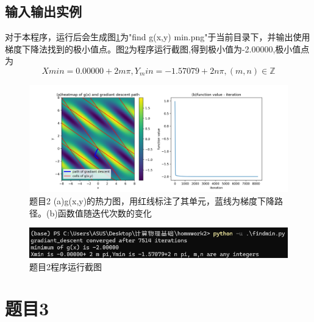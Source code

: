 \documentclass[11pt]{article}
\begin{document}
  \subsection{输入输出实例}
  对于本程序，运行后会生成图\ref{fig:3}为"find g(x,y) min.png"于当前目录下，并输出使用梯度下降法找到的极小值点。图\ref{fig:4}为程序运行截图,得到极小值为-2.00000,极小值点为
  $$Xmin=0.00000+2 m \pi,Y_min=-1.57079+2 n \pi,(m,n)\in \mathbb{Z}$$
  \begin{figure}[ht]
    \centering
    \includegraphics[width=1\linewidth]{photo/find g(x,y) min.png}
    \caption{题目2 (a)g(x,y)的热力图，用红线标注了其单元，蓝线为梯度下降路径。(b)函数值随迭代次数的变化}
    \label{fig:3}
  \end{figure}
  \begin{figure}[ht]
    \centering
    \includegraphics[width=0.6\linewidth]{photo/fig4.png}
    \caption{题目2程序运行截图}
    \label{fig:4}
  \end{figure}

  \section{题目3}
\end{document}
